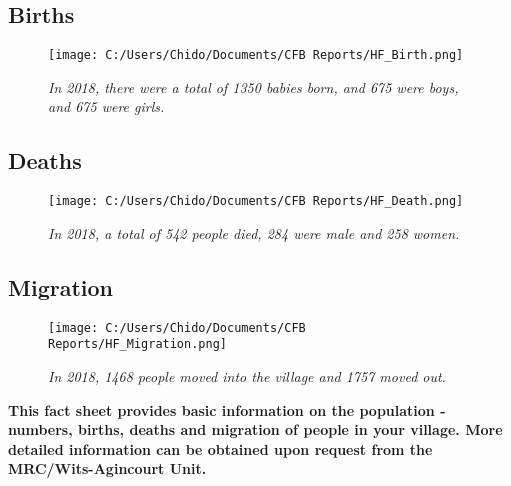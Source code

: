 \documentclass[
]{article}
\begin{document}
\begin{row}

\begin{col-md-4}

\hypertarget{births}{%
\subsection{Births}\label{births}}

\begin{figure}
\centering
\texttt{[image: C:/Users/Chido/Documents/CFB Reports/HF\_Birth.png]}
\caption{\emph{In 2018, there were a total of 1350 babies born, and 675
were boys, and 675 were girls.}}
\end{figure}

\end{col-md-4}

\begin{col-md-4}

\hypertarget{deaths}{%
\subsection{Deaths}\label{deaths}}

\begin{figure}
\centering
\texttt{[image: C:/Users/Chido/Documents/CFB Reports/HF\_Death.png]}
\caption{\emph{In 2018, a total of 542 people died, 284 were male and
258 women.}}
\end{figure}

\end{col-md-4}

\begin{col-md-4}

\hypertarget{migration}{%
\subsection{Migration}\label{migration}}

\begin{figure}
\centering
\texttt{[image: C:/Users/Chido/Documents/CFB Reports/HF\_Migration.png]}
\caption{\emph{In 2018, 1468 people moved into the village and 1757
moved out.}}
\end{figure}

\end{col-md-4}

\end{row}

\textbf{This fact sheet provides basic information on the population -
numbers, births, deaths and migration of people in your village. More
detailed information can be obtained upon request from the
MRC/Wits-Agincourt Unit.}
\end{document}
